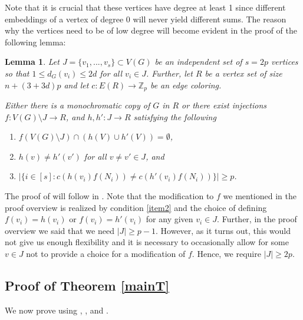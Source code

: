 \documentclass{article}
\newcommand\ZZ{{\mathbb Z}}
\newtheorem{lemma}[theorem]{Lemma}
\theoremstyle{definition}
\begin{document}
Note that it is crucial that these vertices have degree at least 1 since different embeddings of a vertex of degree $0$ will never yield different sums. The reason why the vertices need to be of low degree will become evident in the proof of the following lemma:

\begin{lemma}\label{lem:embedding} Let $J=\{v_1,...,v_s\}\subset V(G)$ be an independent set of $s=2p$ vertices so that $1\leq d_G(v_i)\leq 2d$ for all $v_i\in J$. Further, let $R$ be a vertex set of size $n+(3+3d)p$ and let $c:E(R)\to \ZZ_p$ be an edge coloring. 

Either there is a monochromatic copy of $G$ in $R$ or there exist injections $f:V(G)\setminus J\to R$, and $h,h':J\to R$ satisfying the following
    \begin{enumerate}
        \item $f(V(G)\setminus J)\cap (h(V)\cup h'(V))=\emptyset$,\label{item1a}
        \item $h(v)\neq h'(v')$ for all $v\neq v'\in J$, and \label{item1b}
        \item $ |\{i\in [s]:c(h(v_i)f(N_i))\neq c(h'(v_i)f(N_i))\}| \geq p$.\label{item2}
    \end{enumerate}
\end{lemma}

The proof of  will follow in . Note that the modification to $f$ we mentioned in the proof overview is realized by condition \ref{item2} and the choice of defining $f(v_i)=h(v_i)$ or $f(v_i)=h'(v_i)$ for any given $v_i\in J$. Further, in the proof overview we said that we need $|J|\geq p-1$. However, as it turns out, this would not give us enough flexibility and it is necessary to occasionally allow for some $v\in J$ not to provide a choice for a modification of $f$. Hence, we require $|J|\geq 2p$.

\subsection{Proof of Theorem \ref{mainT}}
We now prove  using , , and . 
\end{document}
